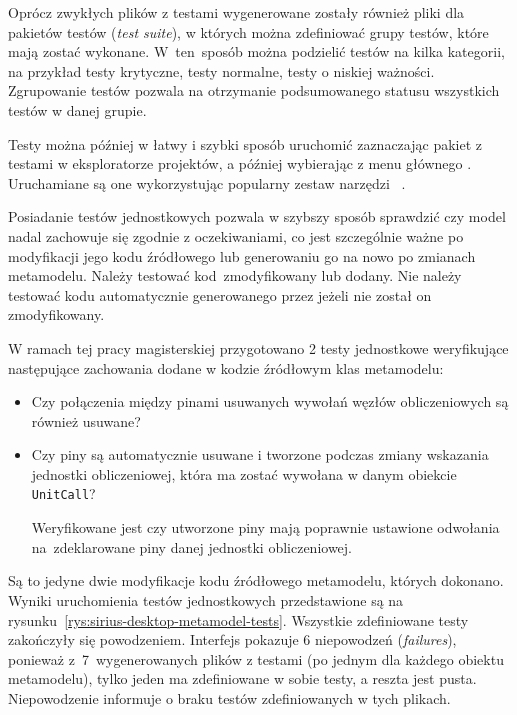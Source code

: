 Oprócz zwykłych plików z testami wygenerowane zostały również pliki dla
pakietów testów (\emph{test suite}), w których można
zdefiniować grupy testów,
które mają zostać wykonane. W~ten~sposób można podzielić testów na kilka
kategorii, na przykład testy krytyczne, testy normalne, testy o niskiej
ważności. Zgrupowanie testów pozwala na otrzymanie podsumowanego statusu
wszystkich testów w danej grupie.

Testy można później w łatwy i szybki sposób uruchomić zaznaczając pakiet z
testami w eksploratorze projektów, a później wybierając z menu głównego
. Uruchamiane są one wykorzystując popularny
zestaw narzędzi \JUnit{}~\cite{junit-test-tutorial}.

Posiadanie testów jednostkowych pozwala w szybszy sposób sprawdzić czy model
nadal zachowuje się zgodnie z oczekiwaniami, co jest szczególnie ważne po
modyfikacji jego kodu źródłowego lub generowaniu go na nowo po zmianach
metamodelu. Należy testować kod~zmodyfikowany lub dodany. Nie należy testować
kodu automatycznie generowanego przez \SiriusDesktop{} jeżeli nie został
on zmodyfikowany.

W ramach tej pracy magisterskiej przygotowano 2 testy jednostkowe weryfikujące
następujące zachowania dodane w kodzie źródłowym klas metamodelu:

\begin{itemize}
	\item Czy połączenia między pinami usuwanych wywołań węzłów
	      obliczeniowych są również usuwane?

	\item Czy piny są automatycznie usuwane i tworzone podczas zmiany
	      wskazania jednostki obliczeniowej, która ma zostać wywołana w
	      danym obiekcie
	      \texttt{UnitCall}?

	      Weryfikowane jest czy utworzone piny mają poprawnie ustawione
	      odwołania na~zdeklarowane piny danej jednostki obliczeniowej.
\end{itemize}

Są to jedyne dwie modyfikacje kodu źródłowego metamodelu, których dokonano.
Wyniki uruchomienia testów jednostkowych przedstawione są na
rysunku~\ref{rys:sirius-desktop-metamodel-tests}. Wszystkie zdefiniowane testy
zakończyły się powodzeniem. Interfejs pokazuje 6 niepowodzeń (\emph{failures}),
ponieważ z~7~wygenerowanych plików z testami (po jednym dla każdego obiektu
metamodelu), tylko jeden ma zdefiniowane w sobie testy, a reszta jest pusta.
Niepowodzenie informuje o braku testów zdefiniowanych w tych plikach.

